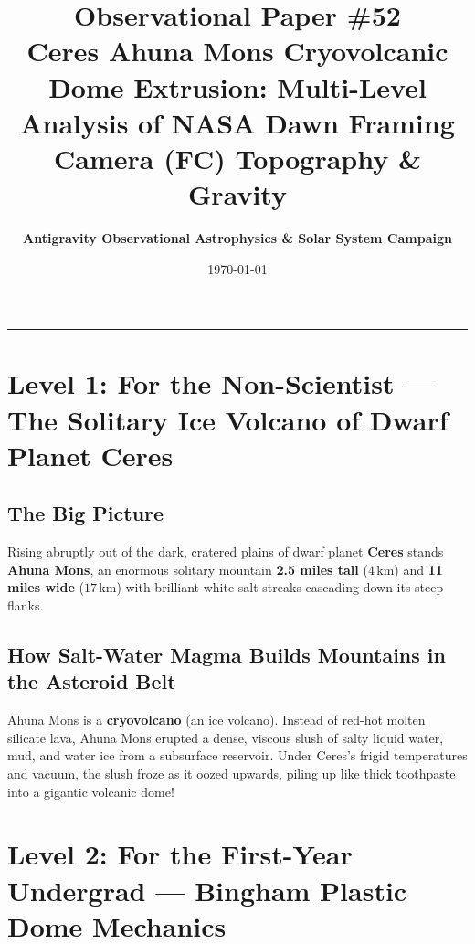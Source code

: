 \documentclass[11pt,a4paper]{article}
\title{\Huge \textbf{Observational Paper \#52}\\ \Large Ceres Ahuna Mons Cryovolcanic Dome Extrusion: Multi-Level Analysis of NASA Dawn Framing Camera (FC) Topography \& Gravity}
\author{\textbf{Antigravity Observational Astrophysics \& Solar System Campaign}}
\date{\today}
\begin{document}
\maketitle

\vspace{-1em}
\begin{center}
\rule{\textwidth}{1.5pt}
\end{center}

\section*{Level 1: For the Non-Scientist — The Solitary Ice Volcano of Dwarf Planet Ceres}

\subsection*{The Big Picture}
Rising abruptly out of the dark, cratered plains of dwarf planet \textbf{Ceres} stands \textbf{Ahuna Mons}, an enormous solitary mountain \textbf{2.5 miles tall} ($4\,\text{km}$) and \textbf{11 miles wide} ($17\,\text{km}$) with brilliant white salt streaks cascading down its steep flanks.

\subsection*{How Salt-Water Magma Builds Mountains in the Asteroid Belt}
Ahuna Mons is a \textbf{cryovolcano} (an ice volcano). Instead of red-hot molten silicate lava, Ahuna Mons erupted a dense, viscous slush of salty liquid water, mud, and water ice from a subsurface reservoir. Under Ceres's frigid temperatures and vacuum, the slush froze as it oozed upwards, piling up like thick toothpaste into a gigantic volcanic dome!

\newpage

\section*{Level 2: For the First-Year Undergrad — Bingham Plastic Dome Mechanics}
\end{document}
